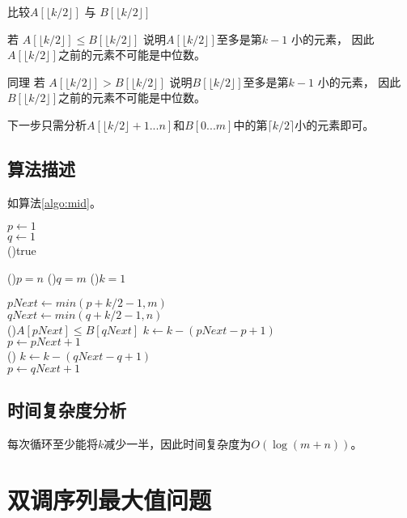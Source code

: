 比较$A[\lfloor k/2 \rfloor]$ 与 $B[\lfloor k/2 \rfloor]$ 

若 $A[\lfloor k/2 \rfloor] \leq B[\lfloor k/2 \rfloor]$ 说明$A[\lfloor k/2 \rfloor]$至多是第$k-1$ 小的元素， 因此$A[\lfloor k/2 \rfloor]$之前的元素不可能是中位数。

同理 若  $A[\lfloor k/2 \rfloor] > B[\lfloor k/2 \rfloor]$ 说明$B[\lfloor k/2 \rfloor]$至多是第$k-1$ 小的元素， 因此$B[\lfloor k/2 \rfloor]$之前的元素不可能是中位数。

下一步只需分析$A[\lfloor k/2 \rfloor + 1...n]$和$B[0...m]$中的第$\lceil k/2 \rceil$小的元素即可。 

\subsection*{算法描述}
如算法\ref{algo:mid}。

\begin{algorithm}
    \caption{$findKthMinElement(A[1..n], B[1..m],k)$}\label{algo:mid}
     $p \leftarrow 1$\\
     $q \leftarrow 1$\\
    \While(){true}{
        \If(){$p = n$}{
        }
        \If(){$q = m$}{
        }
        \If(){$k=1$}{
        }

        $pNext\leftarrow min(p+k/2-1,m)$\\
        $qNext\leftarrow min(q+k/2-1,n)$\\

        \If(){$A[pNext] \leq B[qNext]$}{
            $k \leftarrow k-(pNext - p + 1)$\\
            $p\leftarrow pNext + 1$\\
        }\Else(){
            $k \leftarrow k-(qNext - q + 1)$\\
            $p \leftarrow qNext + 1$\\
        }
    }
    
\end{algorithm}

\subsection*{时间复杂度分析}
每次循环至少能将$k$减少一半，因此时间复杂度为$O(\log (m+n))$。

\section{双调序列最大值问题}
